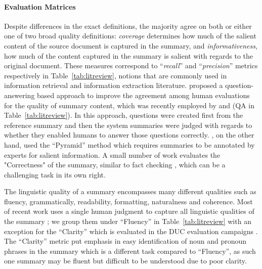 \documentclass[11pt,a4paper]{article}
\begin{document}
\paragraph{Evaluation Matrices}
Despite differences in the exact definitions,
the majority \citep[e.g.,][]{Hsu2018,Celikyilmaz2018,narayan18xsum,Chen2018a,Peyrard2018a} agree on both or either one of two broad quality definitions: {\em coverage} determines how much of the salient content of the source document is captured in the summary,
and {\em informativeness}, 
how much of the content captured in the summary is salient with regards to the original document.
These measures correspond to 
``\textit{recall}'' and ``\textit{precision}'' metrics respectively in Table~\ref{tab:litreview}, notions that are commonly used in information retrieval and information extraction literature.
\citet{Clarke2010} proposed a question-answering based approach to improve the agreement among human evaluations for the quality of summary content, which was recently employed by \citet{narayan18xsum} and \citet{Narayan2018} (QA in Table~\ref{tab:litreview}). In this approach,  questions were created first from the reference summary and then the system summaries were judged with regards to whether they enabled humans to answer those questions correctly. \citet{ShafieiBavani2018}, on the other hand, used the ``Pyramid'' method \citep{Nenkova2004} which requires summaries to be annotated by experts for salient information. %
A small number of work evaluates the "Correctness" \citep{Chen2018a,Li2018b,Chen2018a} of the summary, similar to fact checking \cite{vlachos-riedel:2014:W14-25}, which can be a challenging task in its own right.

The linguistic quality of a summary encompasses many different qualities such as fluency, grammatically, readability, formatting, naturalness and coherence. Most of recent work uses 
a single human judgment
to capture all linguistic qualities of the summary \cite{Hsu2018,Kryscinski2018,narayan18xsum,Song2018a,Guo2018a}; we group them under ``Fluency'' in Table~\ref{tab:litreview} with an exception for the ``Clarity'' which is evaluated in the DUC evaluation campaigns \citet{dang2005overview}. The ``Clarity'' metric put emphasis in easy identification of noun and pronoun phrases in the summary which is a different task compared to ``Fluency'', as such one summary may be fluent but difficult to be understood due to poor clarity. %
\end{document}
